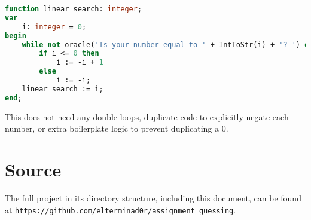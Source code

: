 \documentclass{article}
\begin{document}
\begin{lstlisting}[language=Pascal, caption=Linear search on $\mathbb{Z}$ implementation]
function linear_search: integer;
var
    i: integer = 0;
begin
    while not oracle('Is your number equal to ' + IntToStr(i) + '? ') do
        if i <= 0 then
            i := -i + 1
        else
            i := -i;
    linear_search := i;
end;
\end{lstlisting}

    This does not need any double loops, duplicate code to explicitly negate
    each number, or extra boilerplate logic to prevent duplicating a 0.

    \section{Source}
    The full project in its directory structure, including this document, can
    be found at \verb|https://github.com/elterminad0r/assignment_guessing|.
\end{document}
